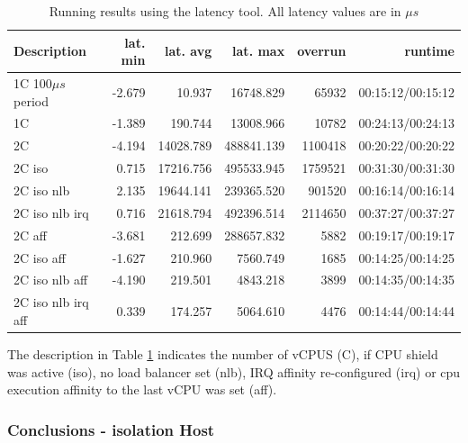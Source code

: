 \documentclass[]{scrartcl}
\begin{document}
\begin{table}[h]
	\caption{Running results using the  latency tool. All latency values are in $\mu s$}
	\begin{tabular}{l|r|r| r|r | r }
		Description &lat. min&lat. avg& lat. max&overrun& runtime\\
		\hline
		1C 100$\mu s$ period&     -2.679&     10.937&  16748.829&   65932&    00:15:12/00:15:12\\
		1C&     -1.389&    190.744&  13008.966&   10782&    00:24:13/00:24:13\\
		2C&     -4.194&  14028.789& 488841.139& 1100418&    00:20:22/00:20:22\\
		2C iso&      0.715&  17216.756& 495533.945& 1759521&    00:31:30/00:31:30\\
		2C iso nlb&      2.135&  19644.141& 239365.520&  901520&   00:16:14/00:16:14\\
		2C iso nlb irq&      0.716&  21618.794& 492396.514& 2114650&  00:37:27/00:37:27\\
		2C aff&     -3.681&    212.699& 288657.832&    5882&   00:19:17/00:19:17\\
		2C iso aff &     -1.627&    210.960&   7560.749&    1685&  00:14:25/00:14:25\\
		2C iso nlb aff &     -4.190&    219.501&   4843.218&    3899&    00:14:35/00:14:35\\
		2C iso nlb irq aff&      0.339&    174.257&   5064.610&    4476&   00:14:44/00:14:44\\

	\end{tabular}
	\label{tab:latency}
\end{table}

The description in Table \ref{tab:latency} indicates the number of vCPUS (C), if CPU shield was active (iso), no load balancer set (nlb), IRQ affinity re-configured (irq) or cpu execution affinity to the last vCPU was set (aff).

\subsubsection{Conclusions - isolation Host}
\label{sec:conciso}
\end{document}

